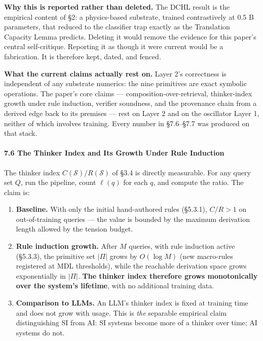 \documentclass[
  11pt,
  a4paper,
]{article}
\providecommand{\tightlist}{%
  \setlength{\itemsep}{0pt}\setlength{\parskip}{0pt}}
\begin{document}
\textbf{Why this is reported rather than deleted.} The DCHL result is
the empirical content of §2: a physics-based substrate, trained
contrastively at 0.5 B parameters, that reduced to the classifier trap
exactly as the Translation Capacity Lemma predicts. Deleting it would
remove the evidence for this paper's central self-critique. Reporting it
as though it were current would be a fabrication. It is therefore kept,
dated, and fenced.

\textbf{What the current claims actually rest on.} Layer 2's correctness
is independent of any substrate numerics: the nine primitives are exact
symbolic operations. The paper's core claims ---
composition-over-retrieval, thinker-index growth under rule induction,
verifier soundness, and the provenance chain from a derived edge back to
its premises --- rest on Layer 2 and on the oscillator Layer 1, neither
of which involves training. Every number in §7.6--§7.7 was produced on
that stack.

\paragraph{7.6 The Thinker Index and Its Growth Under Rule
Induction}\label{the-thinker-index-and-its-growth-under-rule-induction}

The thinker index \(C(\mathcal{S})/R(\mathcal{S})\) of §3.4 is directly
measurable. For any query set \(Q\), run the pipeline, count \(\ell(q)\)
for each \(q\), and compute the ratio. The claim is:

\begin{enumerate}
\def\labelenumi{\arabic{enumi}.}
\tightlist
\item
  \textbf{Baseline.} With only the initial hand-authored rules (§5.3.1),
  \(C/R > 1\) on out-of-training queries --- the value is bounded by the
  maximum derivation length allowed by the tension budget.
\item
  \textbf{Rule induction growth.} After \(M\) queries, with rule
  induction active (§5.3.3), the primitive set \(|\Pi|\) grows by
  \(O(\log M)\) (new macro-rules registered at MDL thresholds), while
  the reachable derivation space grows exponentially in \(|\Pi|\).
  \textbf{The thinker index therefore grows monotonically over the
  system's lifetime}, with no additional training data.
\item
  \textbf{Comparison to LLMs.} An LLM's thinker index is fixed at
  training time and does not grow with usage. This is \emph{the}
  separable empirical claim distinguishing SI from AI: SI systems become
  more of a thinker over time; AI systems do not.
\end{enumerate}
\end{document}
